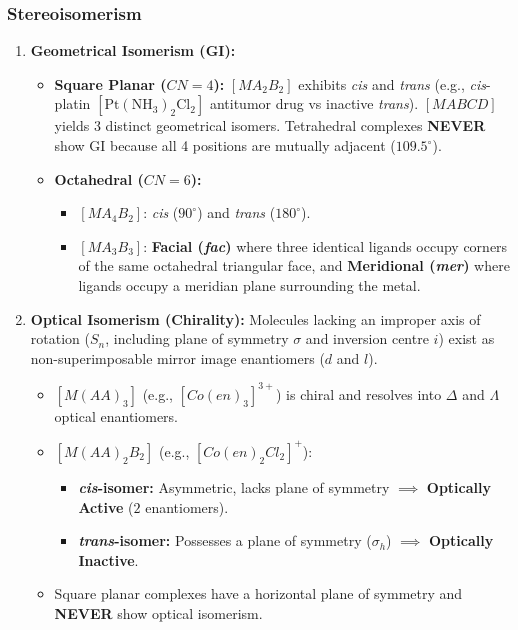\documentclass[10pt,a4paper]{article}
\begin{document}
\subsubsection{Stereoisomerism}
\begin{enumerate}
  \item \textbf{Geometrical Isomerism (GI):}
  \begin{itemize}
    \item \textbf{Square Planar ($CN=4$):} $[MA_2B_2]$ exhibits \textit{cis} and \textit{trans} (e.g., \textit{cis}-platin $[\mathrm{Pt(NH_3)_2Cl_2}]$ antitumor drug vs inactive \textit{trans}). $[MABCD]$ yields 3 distinct geometrical isomers. Tetrahedral complexes \textbf{NEVER} show GI because all 4 positions are mutually adjacent ($109.5^\circ$).
    \item \textbf{Octahedral ($CN=6$):}
    \begin{itemize}
      \item $[MA_4B_2]$: \textit{cis} ($90^\circ$) and \textit{trans} ($180^\circ$).
      \item $[MA_3B_3]$: \textbf{Facial (\textit{fac})} where three identical ligands occupy corners of the same octahedral triangular face, and \textbf{Meridional (\textit{mer})} where ligands occupy a meridian plane surrounding the metal.
    \end{itemize}
  \end{itemize}
  \item \textbf{Optical Isomerism (Chirality):}
  Molecules lacking an improper axis of rotation ($S_n$, including plane of symmetry $\sigma$ and inversion centre $i$) exist as non-superimposable mirror image enantiomers ($d$ and $l$).
  \begin{itemize}
    \item $[M(AA)_3]$ (e.g., $[Co(en)_3]^{3+}$) is chiral and resolves into $\Delta$ and $\Lambda$ optical enantiomers.
    \item $[M(AA)_2B_2]$ (e.g., $[Co(en)_2Cl_2]^+$):
    \begin{itemize}
      \item \textbf{\textit{cis}-isomer:} Asymmetric, lacks plane of symmetry $\implies$ \textbf{Optically Active} ($2$ enantiomers).
      \item \textbf{\textit{trans}-isomer:} Possesses a plane of symmetry ($\sigma_h$) $\implies$ \textbf{Optically Inactive}.
    \end{itemize}
    \item Square planar complexes have a horizontal plane of symmetry and \textbf{NEVER} show optical isomerism.
  \end{itemize}
\end{enumerate}
\end{document}
